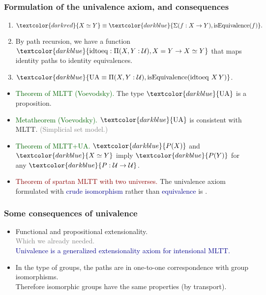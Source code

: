 \documentclass[aspectratio=169]{beamer}
\newcommand{\UA}{\operatorname{UA}}
\newcommand{\isEquivalence}{\operatorname{isEquivalence}}
\newcommand{\idtoeq}{\operatorname{idtoeq}}
\newcommand{\eqq}{\equiv}
\newcommand{\U}{\operatorname{\mathcal{U}}}
\newcommand{\db}{\textcolor{darkblue}}
\newcommand{\dg}{\textcolor{darkgreen}}
\newcommand{\grey}{\textcolor{grey}}
\newcommand{\dr}{\textcolor{darkred}}
\newcommand{\m}[1]{$\db{#1}$}
\begin{document}
\begin{frame}
  \frametitle{Formulation of the univalence axiom, and consequences}

\begin{enumerate}
\vfill \item $\dr{X \simeq Y} \eqq \db{\Sigma(f:X \to Y), \isEquivalence(f)}.$
\vfill \item By path recursion, we have a function \m{\idtoeq : \Pi(X,Y:\U), X = Y \to X \simeq Y} that maps identity paths to identity equivalences.
\vfill \item \m{\UA \eqq \Pi(X,Y:\U), \isEquivalence(\idtoeq \, X \, Y)}.
\end{enumerate}

\begin{itemize}
\vfill \item
\dg{Theorem of MLTT (Voevodsky).} The type \m{\UA} is a proposition.

\vfill \item
\dg{Metatheorem (Voevodsky).} \m{\UA} is consistent with MLTT. \grey{(Simplicial set model.)}

\vfill \item
\dg{Theorem of MLTT+UA.} \m{P(X)} and \m{X \simeq Y} imply \m{P(Y)} for any \m{P : \U \to \U}.

\vfill \item
\dr{Theorem of spartan MLTT with two universes.} The univalence axiom formulated with \db{crude isomorphism} rather than \db{equivalence} is \framebox{\dr{false}}.
\end{itemize}

\end{frame}

\begin{frame}
  \frametitle{Some consequences of univalence}

  \begin{itemize}
  \vfill \item Functional and propositional extensionality. \\[1ex]
  \grey{Which we already needed.} \\[1ex]
  \db{Univalence is a generalized extensionality axiom for intensional MLTT.}
  \vfill \item In the type of groups, the paths are in one-to-one correspondence with group isomorphisms. \\[1ex]
  Therefore isomorphic groups have the same properties (by transport).
  \end{itemize}

\end{frame}
\end{document}

